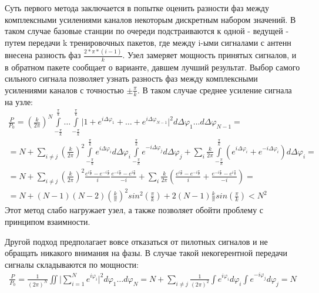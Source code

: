 \documentclass[a4paper,12pt,oneside, abstract=true]{scrartcl}
\begin{document}
Суть первого метода заключается в попытке оценить разности фаз между комплексными усилениями каналов некоторым дискретным набором значений. 
В таком случае базовые станции по очереди подстраиваются к одной - ведущей - путем передачи k тренировочных пакетов, где между i-ыми сигналами с антенн внесена разность фаз $\frac{2*\pi*(i-1)}{k}$. 
Узел замеряет мощность принятых сигналов, и в обратном пакете сообщает о варианте, давшем лучший результат. 
Выбор самого сильного сигнала позволяет узнать разность фаз между комплексными усилениями каналов с точностью $\pm\frac{\pi}{k}$. 
В таком случае среднее усиление сигнала на узле:
\begin{gather}
\frac{P}{P_0} = \left(\frac{k}{2\pi}\right)^N\int\limits_{-\frac{\pi}{k}}^{\frac{\pi}{k}}\ldots\int\limits_{-\frac{\pi}{k}}^{\frac{\pi}{k}}\bigl|1+e^{i\Delta\varphi_1}+\ldots+e^{i\Delta\varphi_{N-1}}\bigr|^2d\Delta\varphi_1\ldots d\Delta\varphi_{N-1} = \nonumber \\
= N + \sum\limits_{i\neq j}\left(\frac{k}{2\pi}\right)^2\int\limits_{-\frac{\pi}{k}}^{\frac{\pi}{k}} e^{i\Delta\varphi_i} d\Delta\varphi_i \int\limits_{-\frac{\pi}{k}}^{\frac{\pi}{k}} e^{-i\Delta\varphi_j}d\Delta\varphi_j + \sum\limits_{i}\frac{k}{2\pi}\int\limits_{-\frac{\pi}{k}}^{\frac{\pi}{k}} \left( e^{i\Delta\varphi_i} + e^{-i\Delta\varphi_i}\right)d\Delta\varphi_i = \nonumber \\
= N +  \sum\limits_{i\neq j}\left(\frac{k}{2\pi}\right)^2\frac{e^{i\frac{\pi}{k}}-e^{-i\frac{\pi}{k}}}{i}\frac{e^{-i\frac{\pi}{k}}-e^{i\frac{\pi}{k}}}{-i}+\sum\limits_{i}\frac{k}{2\pi}\left(\frac{e^{i\frac{\pi}{k}}-e^{-i\frac{\pi}{k}}}{i}+\frac{e^{-i\frac{\pi}{k}}-e^{i\frac{\pi}{k}}}{-i}\right) = \nonumber \\
= N + \left(N-1\right)\left(N-2\right)\left(\frac{k}{\pi}\right)^2sin^2\left(\frac{\pi}{k}\right)+2\left(N-1\right)\frac{k}{\pi}sin\left(\frac{\pi}{k}\right) < N^2
\end{gather}
Этот метод слабо нагружает узел, а также позволяет обойти проблему с принципом взаимности. 

Другой подход предполагает вовсе отказаться от пилотных сигналов и не обращать никакого внимания на фазы. В случае такой некогерентной передачи сигналы складываются по мощности:
\begin{gather}
\frac{P}{P_0} = \frac{1}{\left(2\pi\right)^N}\iint\bigl|\sum\limits_{i=1}^Ne^{i\varphi_i}\bigr|^2d\varphi_1\ldots d\varphi_N = N + \sum\limits_{i\neq j}\frac{1}{\left(2\pi\right)^2}\int e^{i\varphi_i} d\varphi_i \int\limits e^{-i\varphi_j}d\varphi_j = N
\end{gather}
\end{document}
